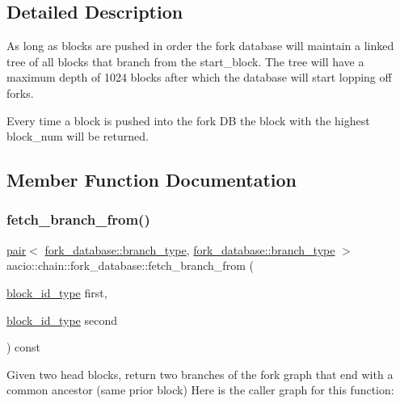 \subsection{Detailed Description}
As long as blocks are pushed in order the fork database will maintain a linked tree of all blocks that branch from the start\+\_\+block. The tree will have a maximum depth of 1024 blocks after which the database will start lopping off forks.

Every time a block is pushed into the fork DB the block with the highest block\+\_\+num will be returned. 

\subsection{Member Function Documentation}
\mbox{\label{classaacio_1_1chain_1_1fork__database_a309c5e2cb8d499551cc71356dfab46cc}} 
\subsubsection{\texorpdfstring{fetch\+\_\+branch\+\_\+from()}{fetch\_branch\_from()}}
{\footnotesize\ttfamily \mbox{\hyperlink{structpair}{pair}}$<$ \mbox{\hyperlink{classstd_1_1vector}{fork\+\_\+database\+::branch\+\_\+type}}, \mbox{\hyperlink{classstd_1_1vector}{fork\+\_\+database\+::branch\+\_\+type}} $>$ aacio\+::chain\+::fork\+\_\+database\+::fetch\+\_\+branch\+\_\+from (\begin{DoxyParamCaption}\item[{\mbox{\hyperlink{classfc_1_1sha256}{block\+\_\+id\+\_\+type}}}]{first,  }\item[{\mbox{\hyperlink{classfc_1_1sha256}{block\+\_\+id\+\_\+type}}}]{second }\end{DoxyParamCaption}) const}

Given two head blocks, return two branches of the fork graph that end with a common ancestor (same prior block) Here is the caller graph for this function\+:
\mbox{\label{classaacio_1_1chain_1_1fork__database_ae9ce87aac5b9f14e08fccff4e6e98fdb}} 
